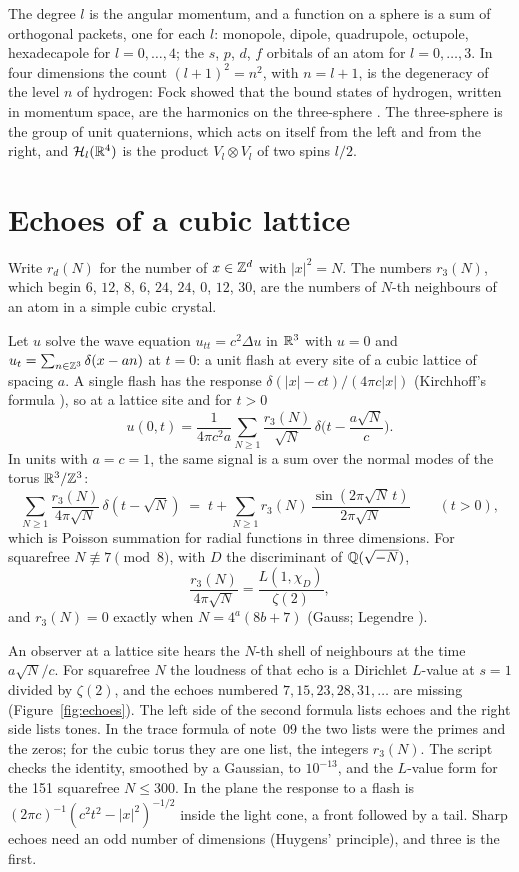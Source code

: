 \documentclass[11pt]{article}
\begin{document}
\physical
The degree $l$ is the angular momentum, and a function on a sphere is a sum of orthogonal packets, one for each $l$: monopole, dipole, quadrupole, octupole, hexadecapole for $l = 0,\dots,4$; the $s$, $p$, $d$, $f$ orbitals of an atom for $l = 0,\dots,3$.
In four dimensions the count $(l+1)^2 = n^2$, with $n = l+1$, is the degeneracy of the level $n$ of hydrogen: Fock showed that the bound states of hydrogen, written in momentum space, are the harmonics on the three-sphere \cite{Fock, BanderItzykson}.
The three-sphere is the group of unit quaternions, which acts on itself from the left and from the right, and $\mathcal H_l(\mathbb{R}^4)$ is the product $V_l\otimes V_l$ of two spins $l/2$.

\section{Echoes of a cubic lattice}

Write $r_d(N)$ for the number of $x\in\mathbb{Z}^d$ with $|x|^2 = N$.
The numbers $r_3(N)$, which begin $6$, $12$, $8$, $6$, $24$, $24$, $0$, $12$, $30$, are the numbers of $N$-th neighbours of an atom in a simple cubic crystal.

\begin{derivation}[echoes]\label{d:echoes}
Let $u$ solve the wave equation $u_{tt} = c^2\Delta u$ in $\mathbb{R}^3$ with $u = 0$ and $u_t = \sum_{n\in\mathbb{Z}^3}\delta(x-an)$ at $t=0$: a unit flash at every site of a cubic lattice of spacing $a$.
A single flash has the response $\delta(|x|-ct)/(4\pi c|x|)$ (Kirchhoff's formula \cite{Evans}), so at a lattice site and for $t>0$
\[
  u(0,t) = \frac{1}{4\pi c^2a}\sum_{N\ge1}\frac{r_3(N)}{\sqrt N}\,\delta\Big(t-\frac{a\sqrt N}{c}\Big).
\]
In units with $a = c = 1$, the same signal is a sum over the normal modes of the torus $\mathbb{R}^3/\mathbb{Z}^3$:
\[
  \sum_{N\ge1}\frac{r_3(N)}{4\pi\sqrt N}\,\delta(t-\sqrt N) \;=\; t+\sum_{N\ge1}r_3(N)\,\frac{\sin(2\pi\sqrt N\,t)}{2\pi\sqrt N}\qquad(t>0),
\]
which is Poisson summation for radial functions in three dimensions.
For squarefree $N\not\equiv7\pmod 8$, with $D$ the discriminant of $\mathbb{Q}(\sqrt{-N})$,
\[
  \frac{r_3(N)}{4\pi\sqrt N} = \frac{L(1,\chi_D)}{\zeta(2)},
\]
and $r_3(N) = 0$ exactly when $N = 4^a(8b+7)$ (Gauss; Legendre \cite{Grosswald}).
\end{derivation}

\physical
An observer at a lattice site hears the $N$-th shell of neighbours at the time $a\sqrt N/c$.
For squarefree $N$ the loudness of that echo is a Dirichlet $L$-value at $s=1$ divided by $\zeta(2)$, and the echoes numbered $7, 15, 23, 28, 31,\dots$ are missing (Figure~\ref{fig:echoes}).
The left side of the second formula lists echoes and the right side lists tones.
In the trace formula of note~09 the two lists were the primes and the zeros; for the cubic torus they are one list, the integers $r_3(N)$.
The script  checks the identity, smoothed by a Gaussian, to $10^{-13}$, and the $L$-value form for the 151 squarefree $N\le300$.
In the plane the response to a flash is $(2\pi c)^{-1}(c^2t^2-|x|^2)^{-1/2}$ inside the light cone, a front followed by a tail.
Sharp echoes need an odd number of dimensions (Huygens' principle), and three is the first.
\end{document}

